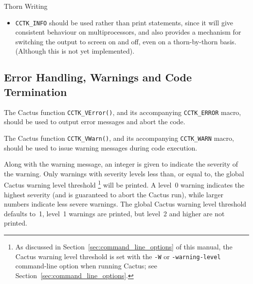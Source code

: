\begin{cactuspart}{Thorn Writing}
\begin{itemize}
\item{} \texttt{CCTK\_INFO} should be used rather than print statements,
       since it will give consistent behaviour on multiprocessors, and
       also provides a mechanism for switching the output to screen on
       and off, even on a thorn-by-thorn basis. (Although this is
       not yet implemented).
\end{itemize}


\subsection{Error Handling, Warnings and Code Termination}
\label{sec:erhawancote}
The Cactus function \texttt{CCTK\_VError()}, and its accompanying
\texttt{CCTK\_ERROR} macro, should be used to output error messages
and abort the code.

The Cactus function \texttt{CCTK\_VWarn()}, and its accompanying
\texttt{CCTK\_WARN} macro, should be used to issue warning messages
during code execution.

Along with the warning message, an integer is given to indicate the
severity of the warning.  Only warnings with severity levels less
than, or equal to, the global Cactus warning level threshold%
\footnote{%
         As discussed in Section~\ref{sec:command_line_options}
         of this manual, the Cactus warning level threshold is
         set with the \texttt{-W} or \texttt{-warning-level}
         command-line option when running Cactus; see
         Section~\ref{sec:command_line_options}.
         }%
{} will be printed.  A level~0 warning indicates the highest severity
(and is guaranteed to abort the Cactus run), while larger numbers
indicate less severe warnings.  The global Cactus warning level threshold
defaults to~1, \ie{} level~1 warnings are printed, but level~2 and higher
are not printed.


\end{cactuspart}
